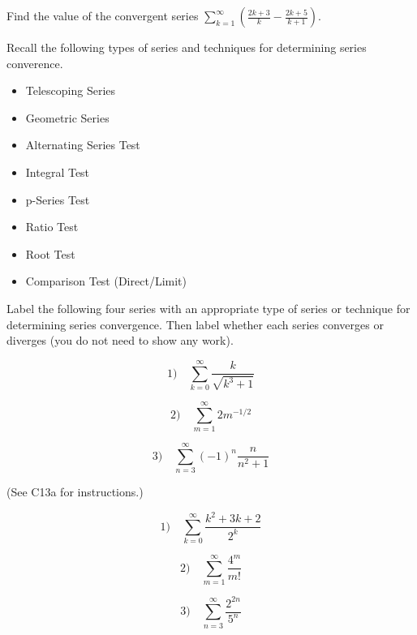 \documentclass[12pt]{article}
\begin{document}

Find the value of the convergent series
\(\sum_{k=1}^\infty (\frac{2k+3}{k}-\frac{2k+5}{k+1})\).



Recall the following types of series and techniques for
determining series converence.

\begin{multicols}{2}
\begin{itemize}
  \item Telescoping Series
  \item Geometric Series
  \item Alternating Series Test
  \item Integral Test
  \item p-Series Test
  \item Ratio Test
  \item Root Test
  \item Comparison Test (Direct/Limit)
\end{itemize}
\end{multicols}

Label the following four series with an appropriate type of series or
technique for determining series convergence. Then label whether
each series converges or diverges (you do not need to show any work).

\begin{multicols}{3}
\[1)\hspace{1em}\sum_{k=0}^\infty \frac{k}{\sqrt{k^3+1}}\]

\[2)\hspace{1em}\sum_{m=1}^\infty 2m^{-1/2}\]

\[3)\hspace{1em}\sum_{n=3}^\infty (-1)^n\frac{n}{n^2+1}\]
\end{multicols}

\newpage


(See C13a for instructions.)

\begin{multicols}{3}
\[1)\hspace{1em}\sum_{k=0}^\infty \frac{k^2+3k+2}{2^k}\]

\[2)\hspace{1em}\sum_{m=1}^\infty \frac{4^m}{m!}\]

\[3)\hspace{1em}\sum_{n=3}^\infty \frac{2^{2n}}{5^n}\]
\end{multicols}
\end{document}
